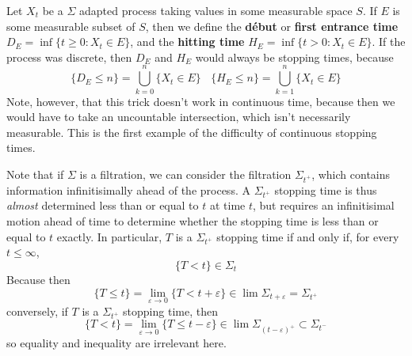 \begin{example}
    Let $X_t$ be a $\Sigma$ adapted process taking values in some measurable space $S$. If $E$ is some measurable subset of $S$, then we define the {\bf d\'{e}but} or {\bf first entrance time} $D_E = \inf \{ t \geq 0: X_t \in E \}$, and the {\bf hitting time} $H_E = \inf \{ t > 0: X_t \in E \}$. If the process was discrete, then $D_E$ and $H_E$ would always be stopping times, because
    \[ \{ D_E \leq n \} = \bigcup_{k = 0}^n \{ X_t \in E \}\ \ \ \ \{ H_E \leq n \} = \bigcup_{k = 1}^n \{ X_t \in E \} \]
    Note, however, that this trick doesn't work in continuous time, because then we would have to take an uncountable intersection, which isn't necessarily measurable. This is the first example of the difficulty of continuous stopping times.
\end{example}

Note that if $\Sigma$ is a filtration, we can consider the filtration $\Sigma_{t^+}$, which contains information infinitisimally ahead of the process. A $\Sigma_{t^+}$ stopping time is thus {\it almost} determined less than or equal to $t$ at time $t$, but requires an infinitisimal motion ahead of time to determine whether the stopping time is less than or equal to $t$ exactly. In particular, $T$ is a $\Sigma_{t^+}$ stopping time if and only if, for every $t \leq \infty$,
%
\[ \{ T < t \} \in \Sigma_t \]
%
Because then
%
\[ \{ T \leq t \} = \lim_{\varepsilon \to 0} \{ T < t + \varepsilon \} \in \lim \Sigma_{t + \varepsilon} = \Sigma_{t^+} \]
%
conversely, if $T$ is a $\Sigma_{t^+}$ stopping time, then
%
\[ \{ T < t \} = \lim_{\varepsilon \to 0} \{ T \leq t - \varepsilon \} \in \lim \Sigma_{(t - \varepsilon)^+} \subset \Sigma_{t^-} \]
%
so equality and inequality are irrelevant here.

